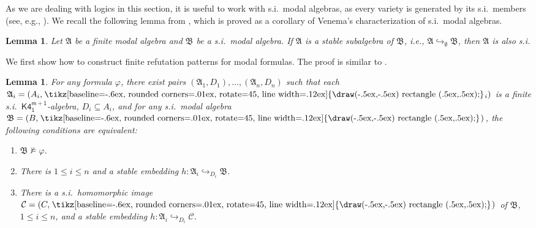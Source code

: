 \documentclass[a4paper,11pt]{article}
\newtheorem{lemma}[theorem]{Lemma}
\theoremstyle{definition}
\theoremstyle{remark}
\numberwithin{theorem}{section}
\newcommand{\alg}[1]{\mathfrak{#1}}
\newcommand{\A}{\alg{A}}
\newcommand{\B}{\alg{B}}
\newcommand{\class}[1]{\mathcal{#1}}
\newcommand{\C}{\class{C}}
\newcommand{\logic}[1]{\mathsf{#1}}
\newcommand{\Kff}[2]{\logic{K4^{#1}_{#2}}}
\renewcommand{\phi}{\varphi}
\newcommand{\emp}{\emptyset}
\newcommand{\gooddiamond}{\hspace{.2ex}\text{%
  \tikz[baseline=-.6ex, rounded corners=.01ex, rotate=45, line width=.12ex]
    {\draw(-.5ex,-.5ex) rectangle (.5ex,.5ex);}}\kern.2ex}
\renewcommand{\Diamond}{\gooddiamond}
\newcommand{\Dia}{\Diamond}
\newcommand{\inj}{\hookrightarrow}
\begin{document}
As we are dealing with logics in this section, it is useful to work with s.i.~modal algebras, as every variety is generated by its s.i.~members (see, e.g., \cite[Corollary 9.7]{ACourseInUniversalAlgebra1981}). We recall the following lemma from \cite[Lemma 6.4]{analgebraicaproachtocanonicalformulas}, which is proved as a corollary of Venema’s characterization \cite{venemaDualCharSI2004} of s.i.~modal algebras. 

\begin{lemma} \label{3: Lem si reflect stable subalg}
    Let $\A$ be a finite modal algebra and $\B$ be a s.i.~modal algebra. If $\A$ is a stable subalgebra of $\B$, i.e., $\A \inj_\emp \B$, then $\A$ is also s.i.
\end{lemma}

We first show how to construct finite refutation patterns for modal formulas. The proof is similar to .

\begin{lemma} \label{3: Lem K4m1 refutation pattern}
    For any formula $\phi$, there exist pairs $(\A_1, D_1), \dots, (\A_n, D_n)$ such that each $\A_i = (A_i, \Dia_i)$ is a finite s.i.~$\Kff{m+1}{1}$-algebra, $D_i \subseteq A_i$, and for any s.i.~modal algebra $\B = (B, \Dia)$, the following conditions are equivalent:
    \begin{enumerate}
        \item[(1)] $\B \not\models \phi$.
        \item[(2)] There is $1 \leq i \leq n$ and a stable embedding $h: \A_i \inj_{D_i} \B$.
        \item[(3)] There is a s.i.~homomorphic image $\C = (C, \Dia)$ of $\B$, $1 \leq i \leq n$, and a stable embedding $h: \A_i \inj_{D_i} \C$.
    \end{enumerate}
\end{lemma}
\end{document}

